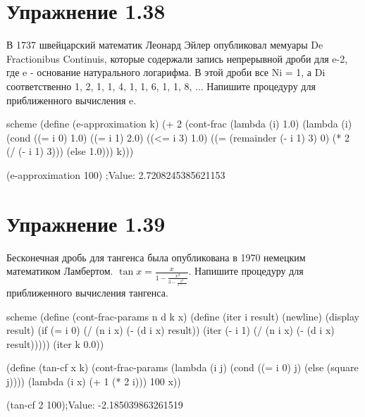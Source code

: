 \chapter{Упражнение 1.38}

В 1737 швейцарский математик Леонард Эйлер опубликовал мемуары De Fractionibus Continuis, которые содержали запись непрерывной дроби для e-2, где e - основание натурального логарифма. В этой дроби все Ni = 1, а Di соответственно 1, 2, 1, 1, 4, 1, 1, 6, 1, 1, 8, ... Напишите процедуру для приближенного вычисления e.

\begin{codelisting}{scheme}
(define (e-approximation k)
  (+ 2 (cont-frac (lambda (i) 1.0)
                  (lambda (i) (cond ((= i 0) 1.0)
                               ((= i 1) 2.0)
                               ((<= i 3) 1.0)
                               ((= (remainder (- i 1) 3) 0) (* 2 (/ (- i 1) 3)))
                               (else 1.0)))
                  k)))

(e-approximation 100) ;Value: 2.7208245385621153
\end{codelisting}


\chapter{Упражнение 1.39}

Бесконечная дробь для тангенса была опубликована в 1970 немецким математиком Ламбертом. $\tan{x}=\frac{x}{1-\frac{x^2}{3-\frac{x^2}{5-...}}}$. Напишите процедуру для приближенного вычисления тангенса.

\begin{codelisting}{scheme}
(define (cont-frac-params n d k x)
  (define (iter i result)
    (newline)
    (display result)
    (if (= i 0)
        (/ (n i x) (- (d i x) result))
        (iter (- i 1) (/ (n i x) (- (d i x) result)))))
  (iter k 0.0))


(define (tan-cf x k)
  (cont-frac-params (lambda (i j) (cond ((= i 0) j)
                          (else (square j))))
           (lambda (i x) (+ 1 (* 2 i)))
           100 x))

(tan-cf 2 100);Value: -2.185039863261519
\end{codelisting}
